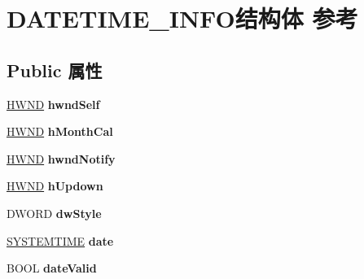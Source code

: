 \hypertarget{struct_d_a_t_e_t_i_m_e___i_n_f_o}{}\section{D\+A\+T\+E\+T\+I\+M\+E\+\_\+\+I\+N\+F\+O结构体 参考}
\label{struct_d_a_t_e_t_i_m_e___i_n_f_o}
\subsection*{Public 属性}
\begin{DoxyCompactItemize}
\item 
\mbox{\label{struct_d_a_t_e_t_i_m_e___i_n_f_o_a0ba01e9ecd0a639800c10d37994e8360}} 
\hyperlink{interfacevoid}{H\+W\+ND} {\bfseries hwnd\+Self}
\item 
\mbox{\label{struct_d_a_t_e_t_i_m_e___i_n_f_o_a195a4a27fdfdd3f2153eb83557847263}} 
\hyperlink{interfacevoid}{H\+W\+ND} {\bfseries h\+Month\+Cal}
\item 
\mbox{\label{struct_d_a_t_e_t_i_m_e___i_n_f_o_a80c79a50977a1943790c757831693a81}} 
\hyperlink{interfacevoid}{H\+W\+ND} {\bfseries hwnd\+Notify}
\item 
\mbox{\label{struct_d_a_t_e_t_i_m_e___i_n_f_o_acded75a928cf5b7882b61d68282ebef1}} 
\hyperlink{interfacevoid}{H\+W\+ND} {\bfseries h\+Updown}
\item 
\mbox{\label{struct_d_a_t_e_t_i_m_e___i_n_f_o_ab83e582a8ee8883e03b7635a1ac30e67}} 
D\+W\+O\+RD {\bfseries dw\+Style}
\item 
\mbox{\label{struct_d_a_t_e_t_i_m_e___i_n_f_o_a5f954a96cb3ccdf8de5a62c35d33564b}} 
\hyperlink{struct___s_y_s_t_e_m_t_i_m_e}{S\+Y\+S\+T\+E\+M\+T\+I\+ME} {\bfseries date}
\item 
\mbox{\label{struct_d_a_t_e_t_i_m_e___i_n_f_o_ad99b86591573030da42845812d95498d}} 
B\+O\+OL {\bfseries date\+Valid}
\item 
\mbox{\label{struct_d_a_t_e_t_i_m_e___i_n_f_o_a176083ede13d632bba17ffbb30a44eb9}} 

\end{DoxyCompactItemize}
